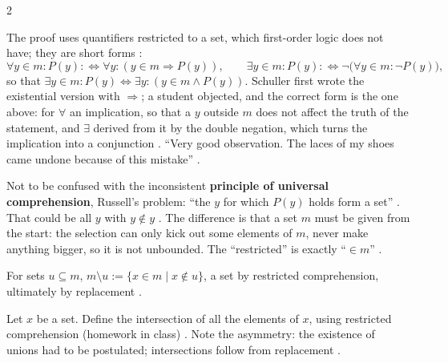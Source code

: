 \begin{paracol}{2}
\begin{remark}\label{rem:se-restricted-q}
The proof uses quantifiers restricted to a set, which first-order logic does not have; they are short forms
:
\[
  \forall y\in m\colon P(y):\Leftrightarrow\forall y\colon(y\in m\Rightarrow P(y)),\qquad
  \exists y\in m\colon P(y):\Leftrightarrow\neg\bigl(\forall y\in m\colon\neg P(y)\bigr),
\]
so that $\exists y\in m\colon P(y)\Leftrightarrow\exists y\colon(y\in m\wedge P(y))$. Schuller first wrote the
existential version with $\Rightarrow$; a student objected, and the correct form is the one above: for $\forall$ an
implication, so that a $y$ outside $m$ does not affect the truth of the statement, and $\exists$ derived from it by
the double negation, which turns the implication into a conjunction .
``Very good observation. The laces of my shoes came undone because of this mistake'' .
\end{remark}

\begin{intuition}
Not to be confused with the inconsistent \textbf{principle of universal comprehension}, Russell's problem: ``the $y$
for which $P(y)$ holds form a set'' . That could be all $y$ with $y\notin y$
. The difference is that a set $m$ must be given from the start: the selection can only kick out some
elements of $m$, never make anything bigger, so it is not unbounded. The ``restricted'' is exactly ``$\in m$''
.
\end{intuition}

\begin{definition}\label{def:se-complement}
For sets $u\subseteq m$, $m\setminus u:=\{x\in m\mid x\notin u\}$, a set by restricted comprehension, ultimately by
replacement .
\end{definition}

\begin{exercise}[Intersections]\label{ex:se-intersection}
Let $x$ be a set. Define the intersection of all the elements of $x$, using restricted comprehension (homework in
class) . Note the asymmetry: the existence of unions had to be postulated; intersections
follow from replacement .
\end{exercise}


\end{paracol}
